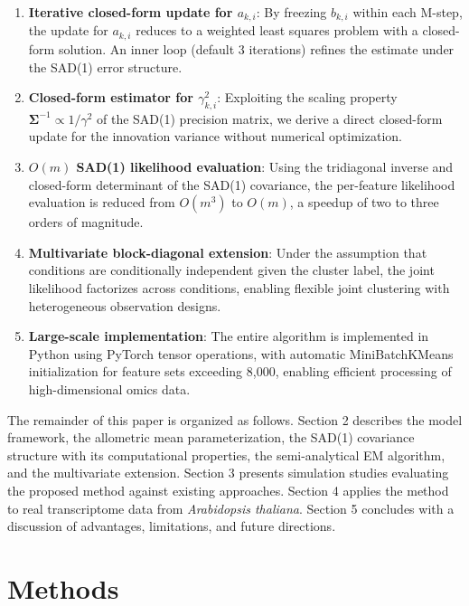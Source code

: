 \documentclass[12pt,a4paper]{article}
\begin{document}
\begin{enumerate}[leftmargin=*]
    \item \textbf{Iterative closed-form update for $a_{k,i}$}: By freezing $b_{k,i}$ within each M-step, the update for $a_{k,i}$ reduces to a weighted least squares problem with a closed-form solution. An inner loop (default 3 iterations) refines the estimate under the SAD(1) error structure.
    \item \textbf{Closed-form estimator for $\gamma_{k,i}^2$}: Exploiting the scaling property $\bm{\Sigma}^{-1} \propto 1/\gamma^2$ of the SAD(1) precision matrix, we derive a direct closed-form update for the innovation variance without numerical optimization.
    \item \textbf{$O(m)$ SAD(1) likelihood evaluation}: Using the tridiagonal inverse and closed-form determinant of the SAD(1) covariance, the per-feature likelihood evaluation is reduced from $O(m^3)$ to $O(m)$, a speedup of two to three orders of magnitude.
    \item \textbf{Multivariate block-diagonal extension}: Under the assumption that conditions are conditionally independent given the cluster label, the joint likelihood factorizes across conditions, enabling flexible joint clustering with heterogeneous observation designs.
    \item \textbf{Large-scale implementation}: The entire algorithm is implemented in Python using PyTorch tensor operations, with automatic MiniBatchKMeans \cite{sculley2010web} initialization for feature sets exceeding 8,000, enabling efficient processing of high-dimensional omics data.
\end{enumerate}

The remainder of this paper is organized as follows. Section 2 describes the model framework, the allometric mean parameterization, the SAD(1) covariance structure with its computational properties, the semi-analytical EM algorithm, and the multivariate extension. Section 3 presents simulation studies evaluating the proposed method against existing approaches. Section 4 applies the method to real transcriptome data from \textit{Arabidopsis thaliana}. Section 5 concludes with a discussion of advantages, limitations, and future directions.

\section{Methods}
\end{document}
